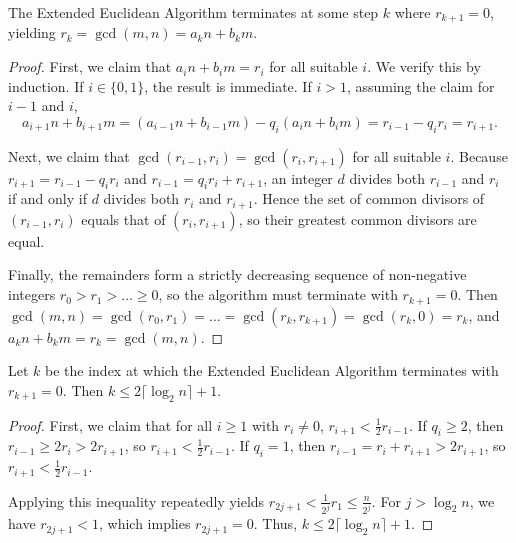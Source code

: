\begin{theorem}
    The Extended Euclidean Algorithm terminates at some step \(k\) where \(r_{k+1} = 0\), yielding \(r_k = \gcd(m, n) = a_k n + b_k m\).
\end{theorem}

\begin{proof}
    First, we claim that \(a_i n + b_i m = r_i\) for all suitable \(i\).
    We verify this by induction.
    If \(i \in \{0, 1\}\), the result is immediate.
    If \(i > 1\), assuming the claim for \(i-1\) and \(i\),
    \[
        a_{i+1} n + b_{i+1} m = (a_{i-1} n + b_{i-1} m) - q_i (a_i n + b_i m) = r_{i-1} - q_i r_i = r_{i+1}.
    \]

    Next, we claim that \(\gcd(r_{i-1}, r_i) = \gcd(r_i, r_{i+1})\) for all suitable \(i\).
    Because \(r_{i+1} = r_{i-1} - q_i r_i\) and \(r_{i-1} = q_i r_i + r_{i+1}\), an integer \(d\) divides both \(r_{i-1}\) and \(r_i\) if and only if \(d\) divides both \(r_i\) and \(r_{i+1}\). Hence the set of common divisors of \((r_{i-1}, r_i)\) equals that of \((r_i, r_{i+1})\), so their greatest common divisors are equal.

    Finally, the remainders form a strictly decreasing sequence of non-negative integers \(r_0 > r_1 > \dots \geq 0\), so the algorithm must terminate with \(r_{k+1} = 0\).
    Then \(\gcd(m, n) = \gcd(r_0, r_1) = \dots = \gcd(r_k, r_{k+1}) = \gcd(r_k, 0) = r_k\), and \(a_k n + b_k m = r_k = \gcd(m, n)\).
\end{proof}

\begin{theorem}
    Let \(k\) be the index at which the Extended Euclidean Algorithm terminates with \(r_{k+1} = 0\). Then \(k \leq 2 \lceil \log_2 n \rceil + 1\).
\end{theorem}

\begin{proof}
    First, we claim that for all \(i \geq 1\) with \(r_i \neq 0\), \(r_{i+1} < \frac{1}{2} r_{i-1}\).
    If \(q_i \geq 2\), then \(r_{i-1} \geq 2 r_i > 2 r_{i+1}\), so \(r_{i+1} < \frac{1}{2} r_{i-1}\).
    If \(q_i = 1\), then \(r_{i-1} = r_i + r_{i+1} > 2 r_{i+1}\), so \(r_{i+1} < \frac{1}{2} r_{i-1}\).

    Applying this inequality repeatedly yields \(r_{2j+1} < \frac{1}{2^j} r_1 \leq \frac{n}{2^j}\). For \(j > \log_2 n\), we have \(r_{2j+1} < 1\), which implies \(r_{2j+1} = 0\). Thus, \(k \leq 2 \lceil \log_2 n \rceil + 1\).
\end{proof}

